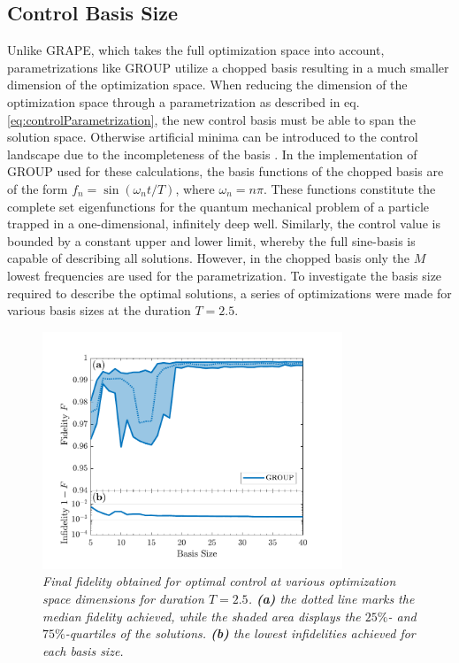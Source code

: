 \subsection{Control Basis Size}
Unlike GRAPE, which takes the full optimization space into account, parametrizations like GROUP utilize a chopped basis resulting in a much smaller dimension of the optimization space. When reducing the dimension of the optimization space through a parametrization as described in eq. \eqref{eq:controlParametrization}, the new control basis must be able to span the solution space. Otherwise artificial minima can be introduced to the control landscape due to the incompleteness of the basis \cite{Rach2015}. 
In the implementation of GROUP used for these calculations, the basis functions of the chopped basis are of the form $f_n = \sin \left( \omega_n t / T \right)$, where $\omega_n = n \pi$. These functions constitute the complete set eigenfunctions for the quantum mechanical problem of a particle trapped in a one-dimensional, infinitely deep well. Similarly, the control value is bounded by a constant upper and lower limit, whereby the full sine-basis is capable of describing all solutions. However, in the chopped basis only the $M$ lowest frequencies are used for the parametrization.
To investigate the basis size required to describe the optimal solutions, a series of optimizations were made for various basis sizes at the duration $T = 2.5$. 
\begin{figure}[h!]
    \centering
    \includegraphics[width=0.8\textwidth]{Figures/5part/BestFidelityBasisSize.pdf}
    \caption{\textit{Final fidelity obtained for optimal control at various optimization space dimensions for duration $T = 2.5$. \textbf{(a)} the dotted line marks the median fidelity achieved, while the shaded area displays the $25\%$- and $75\%$-quartiles of the solutions. \textbf{(b)} the lowest infidelities achieved for each basis size.}}
    \label{fig:FidelityBasisSize5}
\end{figure}
